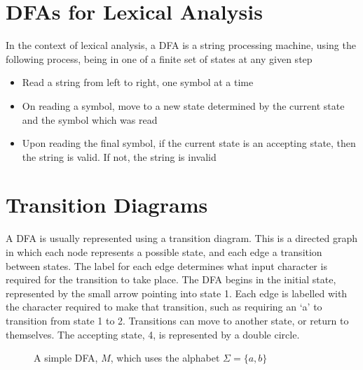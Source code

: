 \section*{DFAs for Lexical Analysis}

In the context of lexical analysis, a DFA is a string processing machine, using the following process, being in one of a
 finite set of states at any given step
\begin{itemize}
  \item Read a string from left to right, one symbol at a time
  \item On reading a symbol, move to a new state determined by the current state and the symbol which was read
  \item Upon reading the final symbol, if the current state is an accepting state, then the string is valid. If not, the
   string is invalid
\end{itemize}

\section*{Transition Diagrams}

A DFA is usually represented using a transition diagram. This is a directed graph in which each node represents a
 possible state, and each edge a transition between states. The label for each edge determines what input character is
 required for the transition to take place. The DFA begins in the initial state, represented by the small arrow pointing
 into state 1. Each edge is labelled with the character required to make that transition, such as requiring an `a' to
 transition from state 1 to 2. Transitions can move to another state, or return to themselves. The accepting state, 4,
 is represented by a double circle.

\begin{figure}[h]
  \centering

  \usetikzlibrary{automata, positioning, arrows}

  \caption{A simple DFA, $M$, which uses the alphabet $\Sigma = \{a, b\}$}
\end{figure}

